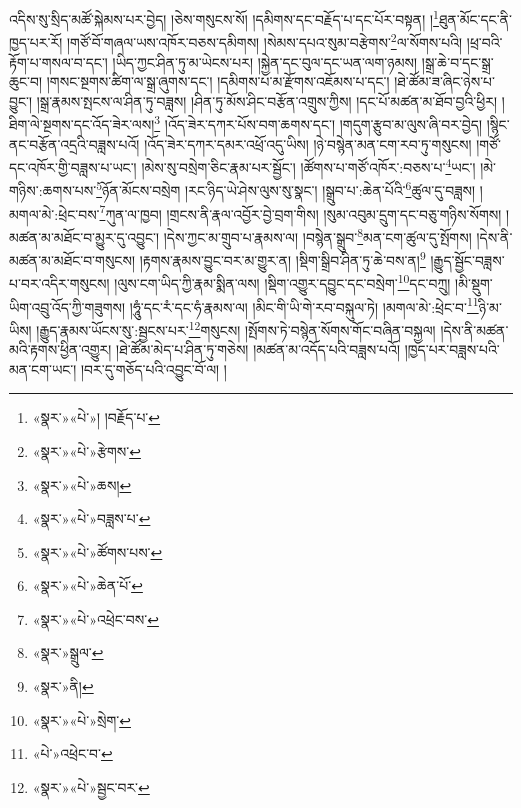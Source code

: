 འདིས་སུ་སྲིད་མཚོ་སྐེམས་པར་བྱེད། །ཅེས་གསུངས་སོ། །དམིགས་དང་བརྗོད་པ་དང་པོར་བསྟན། །\footnote{«སྣར་»«པེ་»། །བརྗོད་པ་}ཐུན་མོང་དང་ནི་ཁྱད་པར་རོ། །གཙོ་བོ་གཞལ་ཡས་འཁོར་བཅས་དམིགས། །སེམས་དཔའ་སུམ་བརྩེགས་\footnote{«སྣར་»«པེ་»རྩེགས་}ལ་སོགས་པའི། །ཕྲ་བའི་རྟོག་པ་གསལ་བ་དང་། །ཡིད་ཀྱང་ཤིན་ཏུ་མ་ཡེངས་པར། །སྐྱེན་དང་བུལ་དང་ཡན་ལག་ཉམས། །སྒྲ་ཆེ་བ་དང་སྒྲ་ཆུང་བ། །གསང་སྔགས་ཚིག་ལ་སྒྲ་ཞུགས་དང་། །དམིགས་པ་མ་རྫོགས་འཇོམས་པ་དང་། །ཐེ་ཚོམ་ཟ་ཞིང་ཉེས་པ་བྱུང་། །སྒྲ་རྣམས་སྤངས་ལ་ཤིན་ཏུ་བཟླས། །ཤིན་ཏུ་མོས་ཤིང་བརྩོན་འགྲུས་ཀྱིས། །དང་པོ་མཚན་མ་ཐོབ་བྱའི་ཕྱིར། །ཐིག་ལེ་སྔགས་དང་འོད་ཟེར་ལས།\footnote{«སྣར་»«པེ་»ཆས།} །འོད་ཟེར་དཀར་པོས་བག་ཆགས་དང་། །གདུག་རྩུབ་མ་ལུས་ཞི་བར་བྱེད། །སྙིང་ནང་བརྩོན་འདྲའི་བཟླས་པའོ། །འོད་ཟེར་དཀར་དམར་འཕྲོ་འདུ་ཡིས། །ཉེ་བསྙེན་མན་ངག་རབ་ཏུ་གསུངས། །གཙོ་དང་འཁོར་གྱི་བཟླས་པ་ཡང་། །མེས་སུ་བསྲེག་ཅིང་རྣམ་པར་སྦྱོང་། །ཚོགས་པ་གཙོ་འཁོར་:བཅས་པ་\footnote{«སྣར་»«པེ་»བཟླས་པ་}ཡང་། །མེ་གཉིས་:ཆགས་པས་\footnote{«སྣར་»«པེ་»ཚོགས་པས་}ཉོན་མོངས་བསྲེག །རང་ཉིད་ཡེ་ཤེས་ལུས་སུ་སྣང་། །སྒྲུབ་པ་:ཆེན་པོའི་\footnote{«སྣར་»«པེ་»ཆེན་པོ་}ཚུལ་དུ་བཟླས། །མགལ་མེ་:ཕྲེང་བས་\footnote{«སྣར་»«པེ་»འཕྲེང་བས་}ཀུན་ལ་ཁྱབ། །གྲངས་ནི་རྣལ་འབྱོར་བྱེ་བྲག་གིས། །སུམ་འབུམ་དྲུག་དང་བཅུ་གཉིས་སོགས། །མཚན་མ་མཐོང་བ་མྱུར་དུ་འབྱུང་། །དེས་ཀྱང་མ་གྲུབ་པ་རྣམས་ལ། །བསྙེན་སྒྲུབ་\footnote{«སྣར་»སྒྲུལ་}མན་ངག་ཚུལ་དུ་སྤོགས། །དེས་ནི་མཚན་མ་མཐོང་བ་གསུངས། །རྟགས་རྣམས་བྱུང་བར་མ་གྱུར་ན། །སྡིག་སྒྲིབ་ཤིན་ཏུ་ཆེ་བས་ན།\footnote{«སྣར་»ནི།} །རྒྱུད་སྦྱོང་བཟླས་པ་བར་འདིར་གསུངས། །ལུས་ངག་ཡིད་ཀྱི་རྣམ་སྨིན་ལས། །སྡིག་འགྱུར་དབྱུང་དང་བསྲེག་\footnote{«སྣར་»«པེ་»སྲེག་}དང་བཀྲུ། །མི་སྡུག་ཡིག་འབྲུ་འོད་ཀྱི་གཟུགས། །ཧཱུཾ་དང་རཾ་དང་ཧཾ་རྣམས་ལ། །མིང་གི་ཡི་གེ་རབ་བསྐུལ་ཏེ། །མགལ་མེ་:ཕྲེང་བ་\footnote{«པེ་»འཕྲེང་བ་}ཉི་མ་ཡིས། །རྒྱུད་རྣམས་ཡོངས་སུ་:སྦྱངས་པར་\footnote{«སྣར་»«པེ་»སྦྱང་བར་}གསུངས། །སྤོགས་ཏེ་བསྙེན་སོགས་གོང་བཞིན་བསྐྱལ། །དེས་ནི་མཚན་མའི་རྟགས་ཕྱིན་འགྱུར། །ཐེ་ཚོམ་མེད་པ་ཤིན་ཏུ་གཅེས། །མཚན་མ་འདོད་པའི་བཟླས་པའོ། །ཁྱད་པར་བཟླས་པའི་མན་ངག་ཡང་། །བར་དུ་གཅོད་པའི་འབྱུང་བོ་ལ། །
